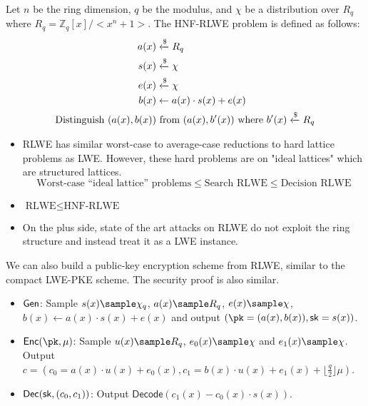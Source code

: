 \begin{definition}
    Let $n$ be the ring dimension, $q$ be the modulus, and $\chi$ be a distribution over $R_q$ where $R_q = \mathbb{Z}_q[x]/<x^n + 1>$. The HNF-RLWE problem is defined as follows:  
    \begin{align*}
        a(x) &\xleftarrow{\$} R_q \\
        s(x) &\xleftarrow{\$} \chi \\
        e(x) &\xleftarrow{\$} \chi \\
        b(x) &\gets a(x) \cdot s(x) + e(x) \\
        \text{Distinguish } (a(x), b(x)) &\text{ from } (a(x), b'(x)) \text{ where } b'(x) \xleftarrow{\$} R_q 
    \end{align*}
\end{definition}
\begin{itemize}
    \item RLWE has similar worst-case to average-case reductions to hard lattice problems as LWE. However, these hard problems are on "ideal lattices" which are structured lattices. 
    $$\text{Worst-case ``ideal lattice'' problems} \leq \text{Search RLWE} \leq \text{Decision RLWE}$$

    \item $\text{RLWE} \leq \text{HNF-RLWE}$
    \item On the plus side, state of the art attacks on RLWE do not exploit the ring structure and instead treat it as a LWE instance.
\end{itemize}

We can also build a public-key encryption scheme from RLWE, similar to the compact LWE-PKE scheme. The security proof is also similar.
\begin{construction}
    \hfill
    \begin{itemize}
        \item $\mathsf{Gen}$: Sample $s(x) \sample \chi_q$, $a(x) \sample R_q$, $e(x) \sample \chi$, $b(x) \gets a(x) \cdot s(x) + e(x)$ and output $(\pk = (a(x),b(x)), \sk = s(x))$.
        \item $\Enc(\pk, \mu)$: Sample $u(x) \sample R_q$, $e_0(x) \sample \chi$ and $e_1(x) \sample \chi$. Output $c = (c_0 = a(x) \cdot u(x) + e_0(x),c_1 =  b(x) \cdot u(x) + e_1(x) + \lfloor\frac{q}{2}\rfloor\mu)$.
        \item $\mathsf{Dec}(\mathsf{sk}, (c_0,c_1))$: Output $\mathsf{Decode}(c_1(x) - c_0(x) \cdot s(x))$.
    \end{itemize}
\end{construction}

